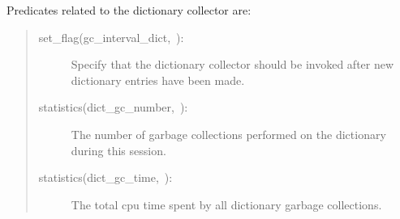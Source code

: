 \noindent Predicates related to the dictionary collector are:
\begin{quote}
\begin{description}
\item [set_flag(gc_interval_dict,~):]
	Specify that the dictionary collector should be invoked after
	 new dictionary entries have been made.
\item [statistics(dict_gc_number,~):]
    The number of garbage collections performed on the dictionary during this
    {\eclipse} session.
\item [statistics(dict_gc_time,~):]
    The total cpu time spent by all dictionary garbage collections.
\end{description}
\end{quote}

